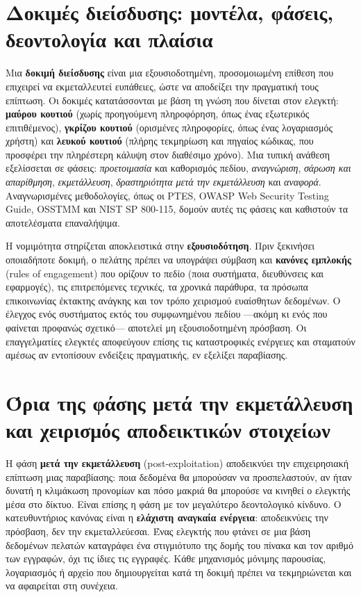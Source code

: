 \documentclass[11pt,openany]{book}
\begin{document}
\section{Δοκιμές διείσδυσης: μοντέλα, φάσεις, δεοντολογία και πλαίσια}\label{sec:10.4}
Μια \textbf{δοκιμή διείσδυσης} είναι μια εξουσιοδοτημένη, προσομοιωμένη επίθεση που επιχειρεί να εκμεταλλευτεί ευπάθειες, ώστε να αποδείξει την πραγματική τους επίπτωση. Οι δοκιμές κατατάσσονται με βάση τη γνώση που δίνεται στον ελεγκτή: \textbf{μαύρου κουτιού} (χωρίς προηγούμενη πληροφόρηση, όπως ένας εξωτερικός επιτιθέμενος), \textbf{γκρίζου κουτιού} (ορισμένες πληροφορίες, όπως ένας λογαριασμός χρήστη) και \textbf{λευκού κουτιού} (πλήρης τεκμηρίωση και πηγαίος κώδικας, που προσφέρει την πληρέστερη κάλυψη στον διαθέσιμο χρόνο). Μια τυπική ανάθεση εξελίσσεται σε φάσεις: \emph{προετοιμασία} και καθορισμός πεδίου, \emph{αναγνώριση}, \emph{σάρωση και απαρίθμηση}, \emph{εκμετάλλευση}, \emph{δραστηριότητα μετά την εκμετάλλευση} και \emph{αναφορά}. Αναγνωρισμένες μεθοδολογίες, όπως οι PTES, OWASP Web Security Testing Guide, OSSTMM και NIST SP 800-115, δομούν αυτές τις φάσεις και καθιστούν τα αποτελέσματα επαναλήψιμα.

Η νομιμότητα στηρίζεται αποκλειστικά στην \textbf{εξουσιοδότηση}. Πριν ξεκινήσει οποιαδήποτε δοκιμή, ο πελάτης πρέπει να υπογράψει σύμβαση και \textbf{κανόνες εμπλοκής} (rules of engagement) που ορίζουν το πεδίο (ποια συστήματα, διευθύνσεις και εφαρμογές), τις επιτρεπόμενες τεχνικές, τα χρονικά παράθυρα, τα πρόσωπα επικοινωνίας έκτακτης ανάγκης και τον τρόπο χειρισμού ευαίσθητων δεδομένων. Ο έλεγχος ενός συστήματος εκτός του συμφωνημένου πεδίου —ακόμη κι ενός που φαίνεται προφανώς σχετικό— αποτελεί μη εξουσιοδοτημένη πρόσβαση. Οι επαγγελματίες ελεγκτές αποφεύγουν επίσης τις καταστροφικές ενέργειες και σταματούν αμέσως αν εντοπίσουν ενδείξεις πραγματικής, εν εξελίξει παραβίασης.

\section{Όρια της φάσης μετά την εκμετάλλευση και χειρισμός αποδεικτικών στοιχείων}\label{sec:10.5}
Η φάση \textbf{μετά την εκμετάλλευση} (post-exploitation) αποδεικνύει την επιχειρησιακή επίπτωση μιας παραβίασης: ποια δεδομένα θα μπορούσαν να προσπελαστούν, αν ήταν δυνατή η κλιμάκωση προνομίων και πόσο μακριά θα μπορούσε να κινηθεί ο ελεγκτής μέσα στο δίκτυο. Είναι επίσης η φάση με τον μεγαλύτερο δεοντολογικό κίνδυνο. Ο κατευθυντήριος κανόνας είναι η \textbf{ελάχιστη αναγκαία ενέργεια}: αποδεικνύεις την πρόσβαση, δεν την εκμεταλλεύεσαι. Ένας ελεγκτής που φτάνει σε μια βάση δεδομένων πελατών καταγράφει ένα στιγμιότυπο της δομής του πίνακα και τον αριθμό των εγγραφών, όχι τις ίδιες τις εγγραφές. Κάθε μηχανισμός μόνιμης παρουσίας, λογαριασμός ή αρχείο που δημιουργείται κατά τη δοκιμή πρέπει να τεκμηριώνεται και να αφαιρείται στη συνέχεια.
\end{document}
